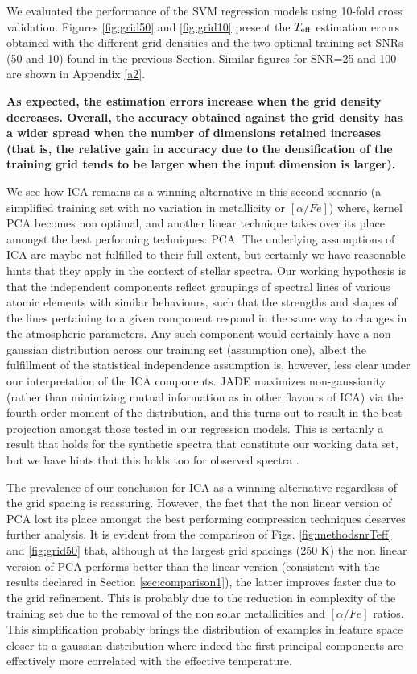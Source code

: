 \documentclass[a4paper,fleqn,usenatbib]{mnras}
\begin{document}
{{{We evaluated the performance of the SVM regression models using
10-fold cross validation. Figures \ref{fig:grid50} and
\ref{fig:grid10} present the $T_{\rm eff}$ estimation errors obtained
with the different grid densities and the two optimal training set
SNRs (50 and 10) found in the previous Section. Similar 
figures for SNR=25 and 100 are shown in Appendix \ref{a2}.

{\bf As expected, the estimation errors increase when the grid 
	density decreases. Overall, the accuracy obtained against 
	the grid density has a wider spread when the number of dimensions 
	retained increases (that is, the relative gain in accuracy due to 
	the densification of the training grid tends to be larger when the 
	input dimension is larger).

We see how ICA remains as a winning alternative in this second scenario (a simplified training set with no variation in metallicity or $\left[ \alpha/Fe \right]$) where, kernel PCA becomes non optimal, and another linear technique takes over its place amongst the best performing techniques: PCA. The underlying assumptions of ICA are maybe not fulfilled to their full extent, but certainly we have reasonable hints that they apply in the context of stellar spectra. Our working hypothesis is that the independent components reflect groupings of spectral lines of various atomic elements with similar behaviours, such that the strengths and shapes of the lines pertaining to a given component respond in the same way to changes in the atmospheric parameters. Any such component would certainly have a non gaussian distribution across our training set (assumption one), albeit the fulfillment of the statistical independence assumption is, however, less clear under our interpretation of the ICA components. JADE maximizes non-gaussianity (rather than minimizing mutual information as in other flavours of ICA) via the fourth order moment of the distribution, and this turns out to result in the best projection amongst those tested in our regression models. This is certainly a result that holds for the synthetic spectra that constitute our working data set, but we have hints that this holds too for observed spectra \citep{2013A&A...550A.120S}.

The prevalence of our conclusion for ICA as a winning alternative regardless of the grid spacing is reassuring. However, the fact that the non linear version of PCA lost its place amongst the best performing compression techniques deserves further analysis. It is evident from the comparison of Figs. \ref{fig:methodsnrTeff} and \ref{fig:grid50} that, although at the largest grid spacings (250 K) the non linear version of PCA performs better than the linear version (consistent with the results declared in Section \ref{sec:comparison1}), the latter improves faster due to the grid refinement. This is probably due to the reduction in complexity of the training set due to the removal of the non solar metallicities and  $\left[ \alpha/Fe \right]$ ratios. This simplification probably brings the distribution of examples in feature space closer to a gaussian distribution where indeed the first principal components are effectively more correlated with the effective temperature.

}}}}
\end{document}
